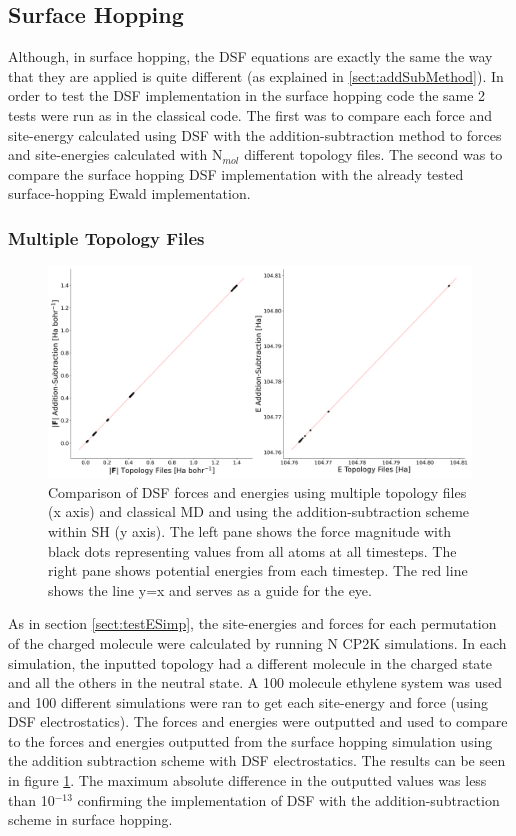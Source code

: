 \subsection{Surface Hopping}
Although, in surface hopping, the DSF equations are exactly the same the way that they are applied is quite different (as explained in \ref{sect:addSubMethod}). In order to test the DSF implementation in the surface hopping code the same 2 tests were run as in the classical code. The first was to compare each force and site-energy calculated using DSF with the addition-subtraction method to forces and site-energies calculated with N$_{mol}$ different topology files. The second was to compare the surface hopping DSF implementation with the already tested surface-hopping Ewald implementation.

\subsubsection{Multiple Topology Files}
\begin{figure}[ht]
  \includegraphics[width=\textwidth]{../img/ES/DSF_SH_test_topologies.png}
	\caption{\label{fig:FSSH_DSF_top}Comparison of DSF forces and energies using multiple topology files (x axis) and classical MD and using the addition-subtraction scheme within SH (y axis). The left pane shows the force magnitude with black dots representing values from all atoms at all timesteps. The right pane shows potential energies from each timestep. The red line shows the line y=x and serves as a guide for the eye.}
\end{figure}
\noindent As in section \ref{sect:testESimp}, the site-energies and forces for each permutation of the charged molecule were calculated by running N CP2K simulations. In each simulation, the inputted topology had a different molecule in the charged state and all the others in the neutral state. A 100 molecule ethylene system was used and 100 different simulations were ran to get each site-energy and force (using DSF electrostatics). The forces and energies were outputted and used to compare to the forces and energies outputted from the surface hopping simulation using the addition subtraction scheme with DSF electrostatics. The results can be seen in figure \ref{fig:FSSH_DSF_top}. The maximum absolute difference in the outputted values was less than 10$^{-13}$ confirming the implementation of DSF with the addition-subtraction scheme in surface hopping.
